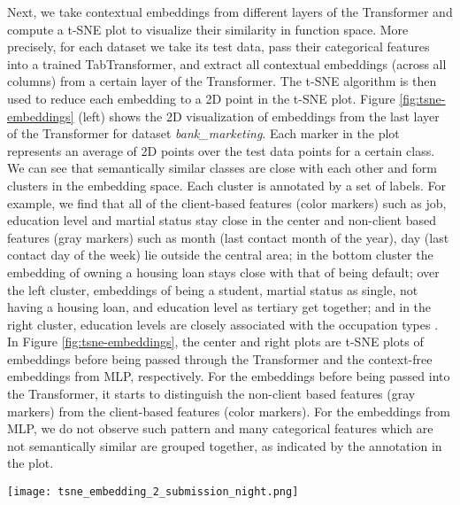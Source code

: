 Next, we take contextual embeddings from different layers of the Transformer and compute a t-SNE plot \citep{maaten2008visualizing} to visualize their similarity in function space. More precisely, for each dataset we 
take its test data, 
pass their categorical features into a trained TabTransformer, and extract all contextual embeddings (across all columns) from a certain layer of the Transformer. The t-SNE algorithm is then used to reduce each embedding to a 2D point in the t-SNE plot. Figure \ref{fig:tsne-embeddings} (left) shows the 2D visualization of embeddings from the last layer of the Transformer for dataset \textit{bank\_marketing}. Each marker in the plot represents an average of 2D points over the test data points for a certain class. We can see that semantically similar classes are close with each other and form clusters in the embedding space. Each cluster is annotated by a set of labels. For example, we find that all of the client-based features (color markers) such as job, education level and martial status stay close in the center and non-client based features (gray markers) such as month (last contact month of the year), day (last contact day of the week) lie outside the central area; in the bottom cluster the embedding of owning a housing loan stays close with that of being default; over the left cluster, embeddings of being a student, martial status as single, not having a housing loan, and education level as tertiary get together; and in the right cluster, education levels are closely associated with the occupation types \citep{eduationjob}.
In Figure \ref{fig:tsne-embeddings}, the center and right plots are t-SNE plots of embeddings before being passed through the Transformer and the context-free embeddings from MLP, respectively. For the embeddings before being passed into the Transformer, it starts to distinguish the non-client based features (gray markers) from the client-based features (color markers). For the embeddings from MLP, we do not observe such pattern and many categorical features which are not semantically similar are grouped together, as indicated by the annotation in the plot.

\begin{figure*}[t]
\centering
\texttt{[image: tsne\_embedding\_2\_submission\_night.png]} %
\caption{t-SNE plots of learned embeddings for categorical features on dataset \textit{BankMarketing}. \textbf{Left}: TabTransformer-the embeddings generated from the last layer of the attention-based Transformer. \textbf{Center}: TabTransformer-the embeddings before being passed into the attention-based Transformer. \textbf{Right}: The embeddings learned from MLP.}
\label{fig:tsne-embeddings}
\end{figure*}

